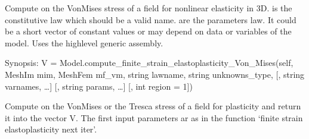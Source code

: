 \documentclass[a4paper,11pt,english]{sphinxmanual}
\begin{document}
\begin{fulllineitems}
\begin{fulllineitems}
\label{\detokenize{python/cmdref_Model:getfem.Model.compute_finite_strain_elasticity_Von_Mises}}
Compute on  the Von\sphinxhyphen{}Mises stress of a field 
for nonlinear elasticity in 3D.  is the constitutive law which
should be a valid name.  are the parameters law. It could be
a short vector of constant values or may depend on data or variables
of the model.
Uses the high\sphinxhyphen{}level generic assembly.

\end{fulllineitems}


\begin{fulllineitems}
\label{\detokenize{python/cmdref_Model:getfem.Model.compute_finite_strain_elastoplasticity_Von_Mises}}
Synopsis: V = Model.compute\_finite\_strain\_elastoplasticity\_Von\_Mises(self, MeshIm mim, MeshFem mf\_vm, string lawname, string unknowns\_type, {[}, string varnames, …{]} {[}, string params, …{]} {[}, int region = \sphinxhyphen{}1{]})

Compute on  the Von\sphinxhyphen{}Mises or the Tresca stress of a field for plasticity and return it into the vector V.
The first input parameters ar as in the function ‘finite strain elastoplasticity next iter’.

\end{fulllineitems}



\end{fulllineitems}
\end{document}
